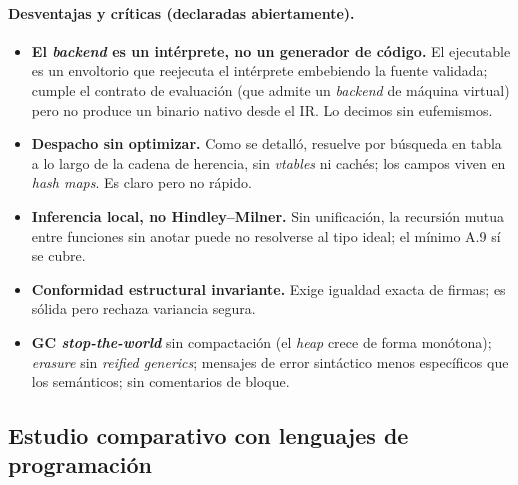 \documentclass[14pts,runningheads,a4paper]{llncs}
\newcommand{\code}[1]{\texttt{\detokenize{#1}}}
\begin{document}
\paragraph{Desventajas y cr\'iticas (declaradas abiertamente).}
\begin{itemize}
  \item \textbf{El \emph{backend} es un int\'erprete, no un generador de c\'odigo.} El
        ejecutable \code{./output} es un envoltorio que reejecuta el int\'erprete
        embebiendo la fuente validada; cumple el contrato de evaluaci\'on (que admite
        un \emph{backend} de m\'aquina virtual) pero no produce un binario nativo desde
        el IR. Lo decimos sin eufemismos.
  \item \textbf{Despacho sin optimizar.} Como se detall\'o, \code{CallMethod} resuelve
        por b\'usqueda en tabla a lo largo de la cadena de herencia, sin \emph{vtables}
        ni cach\'es; los campos viven en \emph{hash maps}. Es claro pero no r\'apido.
  \item \textbf{Inferencia local, no Hindley--Milner.} Sin unificaci\'on, la recursi\'on
        mutua entre funciones sin anotar puede no resolverse al tipo ideal; el m\'inimo
        A.9 s\'i se cubre.
  \item \textbf{Conformidad estructural invariante.} Exige igualdad exacta de firmas;
        es s\'olida pero rechaza variancia segura.
  \item \textbf{GC \emph{stop-the-world}} sin compactaci\'on (el \emph{heap} crece de
        forma mon\'otona); \emph{erasure} sin \emph{reified generics}; mensajes de error
        sint\'actico menos espec\'ificos que los sem\'anticos; sin comentarios de bloque.
\end{itemize}

\subsection{Estudio comparativo con lenguajes de programaci\'on}\label{sec:comparativa}
\end{document}
